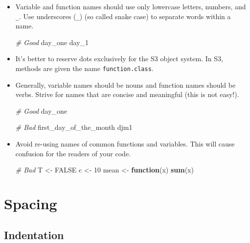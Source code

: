 \documentclass[
]{book}
\newenvironment{Shaded}{\begin{snugshade}}{\end{snugshade}}
\newcommand{\CommentTok}[1]{\textcolor[rgb]{0.56,0.35,0.01}{\textit{#1}}}
\newcommand{\ControlFlowTok}[1]{\textcolor[rgb]{0.13,0.29,0.53}{\textbf{#1}}}
\newcommand{\DecValTok}[1]{\textcolor[rgb]{0.00,0.00,0.81}{#1}}
\newcommand{\KeywordTok}[1]{\textcolor[rgb]{0.13,0.29,0.53}{\textbf{#1}}}
\newcommand{\NormalTok}[1]{#1}
\newcommand{\OtherTok}[1]{\textcolor[rgb]{0.56,0.35,0.01}{#1}}
\newcommand{\StringTok}[1]{\textcolor[rgb]{0.31,0.60,0.02}{#1}}
\begin{document}
\begin{itemize}
\item
  Variable and function names should use only lowercase letters, numbers,
  and \texttt{\_}. Use underscores (\texttt{\_}) (so called snake case) to separate words within
  a name.

\begin{Shaded}
\begin{Highlighting}[]
\CommentTok{# Good}
\NormalTok{day_one}
\NormalTok{day_}\DecValTok{1}
\end{Highlighting}
\end{Shaded}
\item
  It's better to reserve dots exclusively for the S3 object system. In S3,
  methods are given the name \texttt{function.class}.
\item
  Generally, variable names should be nouns and function names should be
  verbs. Strive for names that are concise and meaningful (this is not easy!).

\begin{Shaded}
\begin{Highlighting}[]
\CommentTok{# Good}
\NormalTok{day_one}

\CommentTok{# Bad}
\NormalTok{first_day_of_the_month}
\NormalTok{djm1}
\end{Highlighting}
\end{Shaded}
\item
  Avoid re-using names of common functions and variables. This will cause
  confusion for the readers of your code.

\begin{Shaded}
\begin{Highlighting}[]
\CommentTok{# Bad}
\NormalTok{T <-}\StringTok{ }\OtherTok{FALSE}
\NormalTok{c <-}\StringTok{ }\DecValTok{10}
\NormalTok{mean <-}\StringTok{ }\ControlFlowTok{function}\NormalTok{(x) }\KeywordTok{sum}\NormalTok{(x)}
\end{Highlighting}
\end{Shaded}
\end{itemize}

\hypertarget{spacing}{%
\section{Spacing}\label{spacing}}

\hypertarget{indentation-1}{%
\subsection{Indentation}\label{indentation-1}}
\end{document}
